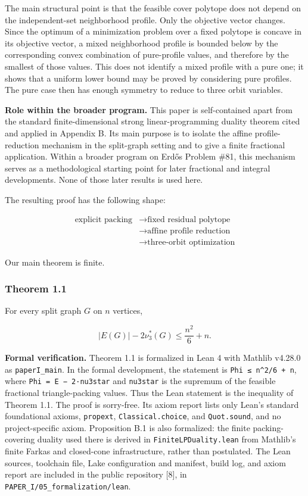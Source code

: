 \documentclass[
  11pt,
]{article}
\begin{document}
The main structural point is that the feasible cover polytope does not
depend on the independent-set neighborhood profile. Only the objective
vector changes. Since the optimum of a minimization problem over a fixed
polytope is concave in its objective vector, a mixed neighborhood
profile is bounded below by the corresponding convex combination of
pure-profile values, and therefore by the smallest of those values. This
does not identify a mixed profile with a pure one; it shows that a
uniform lower bound may be proved by considering pure profiles. The pure
case then has enough symmetry to reduce to three orbit variables.

\textbf{Role within the broader program.} This paper is self-contained
apart from the standard finite-dimensional strong linear-programming
duality theorem cited and applied in Appendix B. Its main purpose is to
isolate the affine profile-reduction mechanism in the split-graph
setting and to give a finite fractional application. Within a broader
program on Erdős Problem \#81, this mechanism serves as a methodological
starting point for later fractional and integral developments. None of
those later results is used here.

The resulting proof has the following shape:

\[
\begin{aligned}
\text{explicit packing}
&\longrightarrow
\text{fixed residual polytope}\\
&\longrightarrow
\text{affine profile reduction}\\
&\longrightarrow
\text{three-orbit optimization}
\end{aligned}
\]

Our main theorem is finite.

\subsubsection{Theorem 1.1}\label{theorem-1.1}

For every split graph \(G\) on \(n\) vertices,

\[
|E(G)|-2\nu_3^*(G)
\le
\frac{n^2}{6}+n.
\]

\textbf{Formal verification.} Theorem 1.1 is formalized in Lean 4 with
Mathlib v4.28.0 as \texttt{paperI\_main}. In the formal development, the
statement is \texttt{Phi\ ≤\ n\^{}2/6\ +\ n}, where
\texttt{Phi\ =\ \textbar{}E\textbar{}\ −\ 2·nu3star} and
\texttt{nu3star} is the supremum of the feasible fractional
triangle-packing values. Thus the Lean statement is the inequality of
Theorem 1.1. The proof is sorry-free. Its axiom report lists only Lean's
standard foundational axioms, \texttt{propext},
\texttt{Classical.choice}, and \texttt{Quot.sound}, and no
project-specific axiom. Proposition B.1 is also formalized: the finite
packing-covering duality used there is derived in
\texttt{FiniteLPDuality.lean} from Mathlib's finite Farkas and
closed-cone infrastructure, rather than postulated. The Lean sources,
toolchain file, Lake configuration and manifest, build log, and axiom
report are included in the public repository {[}8{]}, in
\texttt{PAPER\_I/05\_formalization/lean}.
\end{document}
